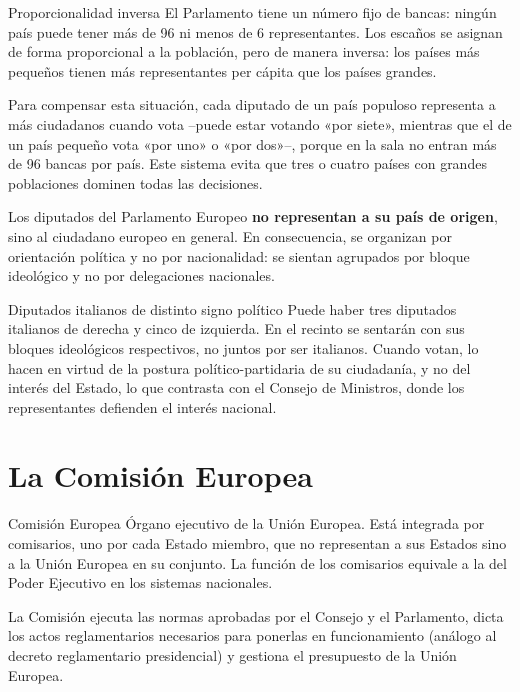 \documentclass[12pt,oneside]{book}
\begin{document}
\begin{definicion}{Proporcionalidad inversa}
El Parlamento tiene un número fijo de bancas: ningún país puede tener más de 96 ni menos de 6 representantes. Los escaños se asignan de forma proporcional a la población, pero de manera inversa: los países más pequeños tienen más representantes per cápita que los países grandes.
\end{definicion}

Para compensar esta situación, cada diputado de un país populoso representa a más ciudadanos cuando vota --puede estar votando «por siete», mientras que el de un país pequeño vota «por uno» o «por dos»--, porque en la sala no entran más de 96 bancas por país. Este sistema evita que tres o cuatro países con grandes poblaciones dominen todas las decisiones.

Los diputados del Parlamento Europeo \textbf{no representan a su país de origen}, sino al ciudadano europeo en general. En consecuencia, se organizan por orientación política y no por nacionalidad: se sientan agrupados por bloque ideológico y no por delegaciones nacionales.

\begin{ejemplo}{Diputados italianos de distinto signo político}
Puede haber tres diputados italianos de derecha y cinco de izquierda. En el recinto se sentarán con sus bloques ideológicos respectivos, no juntos por ser italianos. Cuando votan, lo hacen en virtud de la postura político-partidaria de su ciudadanía, y no del interés del Estado, lo que contrasta con el Consejo de Ministros, donde los representantes defienden el interés nacional.
\end{ejemplo}

\section{La Comisión Europea}

\begin{definicion}{Comisión Europea}
Órgano ejecutivo de la Unión Europea. Está integrada por comisarios, uno por cada Estado miembro, que no representan a sus Estados sino a la Unión Europea en su conjunto. La función de los comisarios equivale a la del Poder Ejecutivo en los sistemas nacionales.
\end{definicion}

La Comisión ejecuta las normas aprobadas por el Consejo y el Parlamento, dicta los actos reglamentarios necesarios para ponerlas en funcionamiento (análogo al decreto reglamentario presidencial) y gestiona el presupuesto de la Unión Europea.
\end{document}
